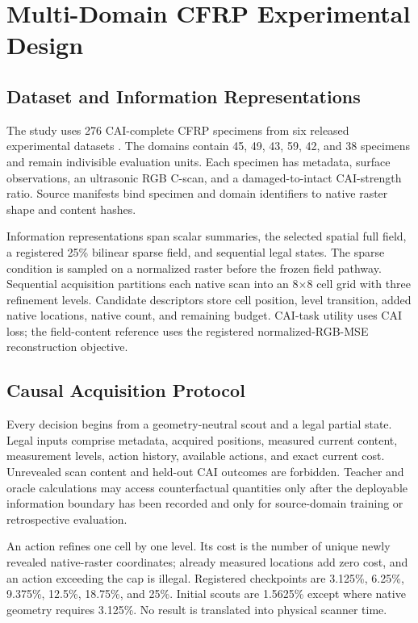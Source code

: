 \documentclass[preprint,12pt]{elsarticle}
\begin{document}
\section{Multi-Domain CFRP Experimental Design}
\label{sec:case-study}

\subsection{Dataset and Information Representations}
\label{sec:dataset-representations}

The study uses 276 CAI-complete CFRP specimens from six released experimental
datasets \cite{hasebe2022dataset,hasebe2025caidataset}. The domains contain
45, 49, 43, 59, 42, and 38 specimens and remain indivisible evaluation units.
Each specimen has metadata, surface observations, an ultrasonic RGB C-scan,
and a damaged-to-intact CAI-strength ratio. Source manifests bind specimen and
domain identifiers to native raster shape and content hashes.

Information representations span scalar summaries, the selected spatial full
field, a registered 25\% bilinear sparse field, and sequential legal states.
The sparse condition is sampled on a normalized raster before the frozen field
pathway. Sequential acquisition partitions each native scan into an
8$\times$8 cell grid with three refinement levels. Candidate descriptors store
cell position, level transition, added native locations, native count, and
remaining budget. CAI-task utility uses CAI loss; the field-content reference
uses the registered normalized-RGB-MSE reconstruction objective.



\subsection{Causal Acquisition Protocol}
\label{sec:causal-protocol}

Every decision begins from a geometry-neutral scout and a legal partial state.
Legal inputs comprise metadata, acquired positions, measured current content,
measurement levels, action history, available actions, and exact current cost.
Unrevealed scan content and held-out CAI outcomes are forbidden. Teacher and
oracle calculations may access counterfactual quantities only after the
deployable information boundary has been recorded and only for source-domain
training or retrospective evaluation.

An action refines one cell by one level. Its cost is the number of unique newly
revealed native-raster coordinates; already measured locations add zero cost,
and an action exceeding the cap is illegal. Registered checkpoints are
3.125\%, 6.25\%, 9.375\%, 12.5\%, 18.75\%, and 25\%. Initial scouts are 1.5625\%
except where native geometry requires 3.125\%.
No result is translated into physical scanner time.
\end{document}
